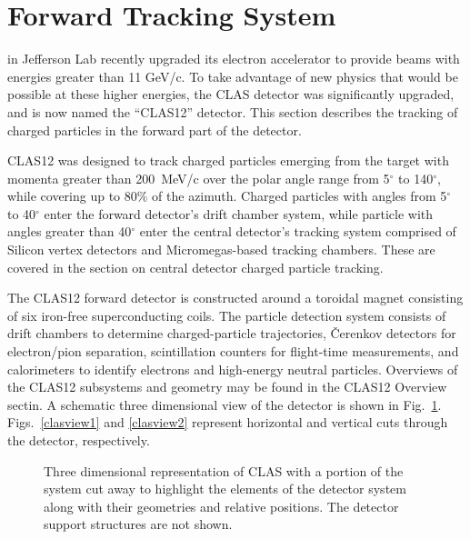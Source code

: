 \section{Forward Tracking System}
\label{overview}

 in
Jefferson Lab recently upgraded its electron accelerator to provide beams with 
energies greater than 11 GeV/c.  To take advantage of new physics that would 
be possible at these higher energies, the CLAS detector was significantly
upgraded, and is now named the ``CLAS12'' detector.  This section describes
the tracking of charged particles in the forward part of the detector.

CLAS12 was designed to track charged particles emerging from the target with
momenta greater than 200~MeV/c over the polar angle range from 5$^{\circ}$ to 
140$^{\circ}$, while covering up to 80$\%$ of the azimuth.  Charged particles with 
angles from 5$^{\circ}$ to 40$^{\circ}$ enter the forward detector's drift chamber
system, while particle with angles greater than 40$^{\circ}$ enter the 
central detector's tracking system comprised of Silicon vertex detectors and
Micromegas-based tracking chambers.  These are covered in the section
on central detector charged particle tracking.

The CLAS12 forward detector is constructed around a toroidal magnet consisting of six 
iron-free superconducting coils.  The particle detection system consists of drift 
chambers to determine charged-particle trajectories, {\v C}erenkov detectors 
for electron/pion separation, scintillation counters for flight-time 
measurements, and calorimeters to identify electrons and high-energy neutral 
particles.  Overviews of the CLAS12 subsystems and geometry may be found in the 
CLAS12 Overview sectin.  A schematic three 
dimensional view of the detector is shown in Fig.~\ref{clasview_3d}.  
Figs.~\ref{clasview1} and \ref{clasview2} represent horizontal and vertical 
cuts through the detector, respectively.

\begin{figure}[htpb]
\vspace{6.7cm} 
\caption{\small{Three dimensional representation of CLAS with a portion
of the system cut away to highlight the elements of the detector system 
along with their geometries and relative positions.  The detector support
structures are not shown.}}
\label{clasview_3d}
\end{figure}



